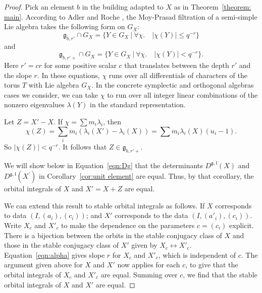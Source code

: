 \documentclass[11pt]{amsart}
\theoremstyle{definition}
\theoremstyle{remark}
\numberwithin{equation}{theorem}
\def\lF{{\mathfrak{l}}}
\def\gF{{\mathfrak{g}}}
\def\tq{{\ \vert\ }}
\def\lie#1{{\mathfrak{#1}}}
\begin{document}
\begin{proof}
Pick an element $b$ in the building adapted to $X$ as in
Theorem~\ref{theorem: main}. According to Adler and Roche
\cite[\S~2]{A}, the Moy-Prasad filtration of a semi-simple Lie
algebra takes the following form on $G_X$:
    \begin{equation}
    \lie{g}_{b,r'} \cap G_X = \{ Y\in G_X \tq \forall\chi.\quad
    |\chi(Y)|\le q^{-r}\}
    \label{eqn:alpha}
    \end{equation}
and
    \begin{equation}\lie{g}_{b,r'+} \cap G_X = \{ Y\in G_X \tq
    \forall\chi.\quad
    |\chi(Y)|< q^{-r}\}.\end{equation}
Here $r'=c r$ for some positive scalar $c$ that translates between
the depth $r'$ and the slope $r$.  In these equations, $\chi$ runs
over all differentials of characters of the torus $T$ with Lie
algebra $G_X$.  In the concrete symplectic and orthogonal algebras
cases we consider, we can take $\chi$ to run over all integer
linear combinations of the nonzero eigenvalues $\lambda(Y)$ in the
standard representation.

Let $Z = X'-X$. If $\chi = \sum m_i\lambda_i$, then
    \begin{equation}\chi(Z) =
    \sum_i m_i(\lambda_i(X')-\lambda_i(X)) =
\sum m_i \lambda_i(X)(u_i-1).\end{equation} So $|\chi(Z)|<q^{-r}$.
It follows that $Z\in \lie{g}_{b,r'+}$.

We will show below in Equation~\ref{eqn:Dg} that the determinants
$D^{\gF,\lF}(X)$ and $D^{\gF,\lF}(X^\prime)$ in
Corollary~\ref{cor:unit element} are equal. Thus, by that
corollary, the orbital integrals of $X$ and $X' = X+Z$ are equal.

We can extend this result to stable orbital integrals as follows.
If $X$ corresponds to data $(I,(a_i),(c_i))$; and $X'$ corresponds
to the data $(I,(a'_i),(c_i))$.  Write $X_c$ and $X'_c$ to make
the dependence on the parameters $c=(c_i)$ explicit.  There is a
bijection between the orbits in the stable conjugacy class of $X$
and those in the stable conjugacy class of $X'$ given by
$X_c\leftrightarrow X'_c$.  Equation~\ref{eqn:alpha} gives slope
$r$ for $X_c$ and $X'_c$, which is independent of $c$.  The
argument given above for $X$ and $X'$ now applies for each $c$, to
give that the orbital integrals of $X_c$ and $X'_c$ are equal.
Summing over $c$, we find that the stable orbital integrals of $X$
and $X'$ are equal.
\end{proof}

\end{document}
